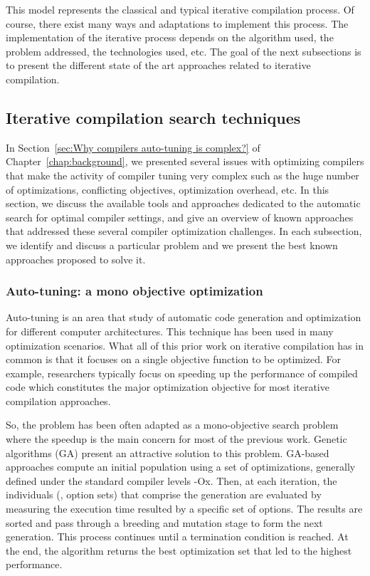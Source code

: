 This model represents the classical and typical iterative compilation process. Of course, there exist many ways and adaptations to implement this process. The implementation of the iterative process depends on the algorithm used, the problem addressed, the technologies used, etc. The goal of the next subsections is to present the different state of the art approaches related to iterative compilation.

\subsection{Iterative compilation search techniques}
In Section~\ref{sec:Why compilers auto-tuning is complex?} of Chapter~\ref{chap:background}, we presented several issues with optimizing compilers that make the activity of compiler tuning very complex such as the huge number of optimizations, conflicting objectives, optimization overhead, etc.
In this section, we discuss the available tools and approaches dedicated to the automatic search for optimal compiler settings, and give an overview of known approaches that addressed these several compiler optimization challenges. In each subsection, we identify and discuss a particular problem and we present the best known approaches proposed to solve it.

\subsubsection{Auto-tuning: a mono objective optimization}
Auto-tuning is an area that study of automatic code generation and optimization for different computer architectures.
This technique has been used in many optimization scenarios.
What all of this prior work on iterative compilation has in common is that it focuses on a single objective function to be optimized. For example, researchers typically focus on speeding up the performance of compiled code which constitutes the major optimization objective for most iterative compilation approaches\cite{pan2006fast,haneda2005automatic}. 

So, the problem has been often adapted as a mono-objective search problem where the speedup is the main concern for most of the previous work. 
Genetic algorithms (GA)\cite{stephenson2003genetic,bashkansky2007black} present an attractive solution to this problem. 
GA-based approaches compute an initial population using a set of optimizations, generally defined under the standard compiler levels -Ox. Then, at each iteration, the individuals (\ie, option sets) that comprise the generation are evaluated by measuring the execution time resulted by a specific set of options. The results are sorted and pass through a breeding and mutation stage to form the next generation. This
process continues until a termination condition is reached. At the end, the algorithm returns the best optimization set that led to the highest performance.

